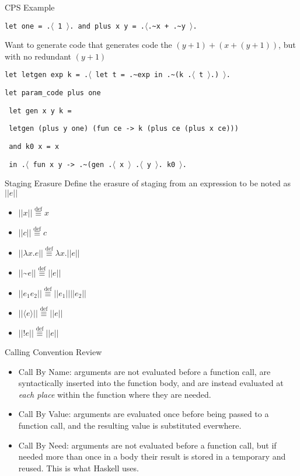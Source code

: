 \documentclass{beamer}
\newcommand{\defeq}{\overset{\text{def}}\equiv}
\begin{document}
\begin{frame}{CPS Example}
\small

\texttt{let one = .$\langle$ 1 $\rangle$. and plus x y =
  .$\langle$.\textasciitilde x  + .\textasciitilde y $\rangle$.}

\vspace{3mm}

Want to generate code that generates code the $(y + 1) +
(x + (y + 1))$, but with no redundant $(y + 1)$

\vspace{3mm}

\texttt{let letgen exp k = .$\langle$ let t = .\textasciitilde exp in
  .\textasciitilde (k  .$\langle$ t $\rangle$.) $\rangle$. }

\vspace{3mm}

\texttt{let param\_code plus one }

\texttt{  let gen x y k = }

\texttt{      letgen (plus y one) (fun ce -> k (plus ce  (plus x ce)))}

\texttt{  and k0 x = x}

\texttt{  in  .$\langle$ fun x y ->  .\textasciitilde (gen .$\langle$ x $\rangle$ .$\langle$ y $\rangle$. k0 $\rangle$.  }

\end{frame}



\begin{frame}{Staging Erasure}
Define the erasure of staging from an expression to be noted as $||e||$\\
\begin{itemize}
  \item $||x|| \defeq x$
  \item $||c|| \defeq c$
  \item $||\lambda x.e|| \defeq \lambda x.||e||$
  \item $||$\textasciitilde$e|| \defeq ||e||$
  \item $||e_1 e_2|| \defeq ||e_1|| ||e_2||$
  \item $||\langle e \rangle|| \defeq ||e||$
  \item $||!e|| \defeq ||e||$
\end{itemize}
\end{frame}

\begin{frame}{Calling Convention Review}
\begin{itemize}
  \item Call By Name: arguments are not evaluated before a function call, are syntactically inserted into the function body, and are instead evaluated at \textit{each place} within the function where they are needed.
  \item Call By Value: arguments are evaluated once before being passed to a function call, and the resulting value is substituted everwhere.
  \item Call By Need: arguments are not evaluated before a function call, but if needed more than once in a body their result is stored in a temporary and reused. This is what Haskell uses.
\end{itemize}
\end{frame}
\end{document}
